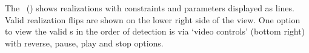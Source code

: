 The \rview\ () shows realizations with constraints
and parameters displayed as lines. Valid realization flips are shown
on the lower right side of the view. One option to view the valid
\param s in the order of detection is via `video controls' (bottom
right) with reverse, pause, play and stop options.
